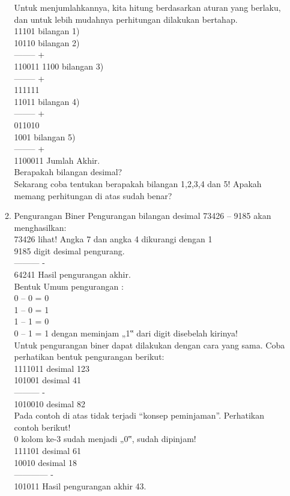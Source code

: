 \documentclass{article}
\begin{document}
\begin{enumerate}
\begin{enumerate}
Untuk menjumlahkannya, kita hitung berdasarkan aturan yang berlaku, dan untuk lebih mudahnya perhitungan dilakukan bertahap. \\
11101 bilangan 1) \\
10110 bilangan 2) \\
-------- + \\
110011
1100 bilangan 3) \\
-------- + \\
111111 \\
11011 bilangan 4) \\ 
-------- + \\
011010 \\
1001 bilangan 5) \\ 
-------- + \\
1100011 \textrightarrow Jumlah Akhir. \\
Berapakah bilangan desimal? \\
Sekarang coba tentukan berapakah bilangan 1,2,3,4 dan 5! Apakah memang perhitungan di atas sudah benar? \\

\item Pengurangan Biner
Pengurangan bilangan desimal 73426 – 9185 akan menghasilkan: \\
73426 \textrightarrow lihat! Angka 7 dan angka 4 dikurangi dengan 1 \\
9185 \textrightarrow digit desimal pengurang. \\
--------- - \\
64241 \textrightarrow Hasil pengurangan akhir. \\
Bentuk Umum pengurangan : \\
0 – 0 = 0 \\
1 – 0 = 1 \\
1 – 1 = 0 \\
0 – 1 = 1 \textrightarrow dengan meminjam „1‟ dari digit disebelah kirinya! \\ 
Untuk pengurangan biner dapat dilakukan dengan cara yang sama. Coba perhatikan bentuk pengurangan berikut: \\
1111011 \textrightarrow desimal 123 \\
101001 \textrightarrow desimal 41 \\
--------- - \\
1010010 \textrightarrow desimal 82 \\
Pada contoh di atas tidak terjadi “konsep peminjaman”. Perhatikan contoh berikut! \\
0 \textrightarrow kolom ke-3 sudah menjadi „0‟, sudah dipinjam! \\
111101 \textrightarrow desimal 61 \\
10010 \textrightarrow desimal 18 \\
------------ - \\
101011 \textrightarrow Hasil pengurangan akhir 43. \\


\end{enumerate}
\end{enumerate}
\end{document}
